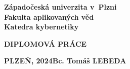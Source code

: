 

%
\thispagestyle{empty}
%
\begin{Large}
	\vspace*{-1cm}
	\begin{center}
		\textbf{Západočeská univerzita v~Plzni\\Fakulta aplikovaných věd\\Katedra kybernetiky}\\
		\vspace*{7cm}
		\begin{LARGE}
			\textbf{DIPLOMOVÁ PRÁCE}\\
		\end{LARGE}
	\end{center}
\end{Large}
\vspace*{8cm}
\begin{large}
	\hspace*{-5mm}\textbf{PLZEŇ, 2024}\hfill \textbf{Bc. Tomáš LEBEDA}\hspace*{-5mm}
\end{large}
%
